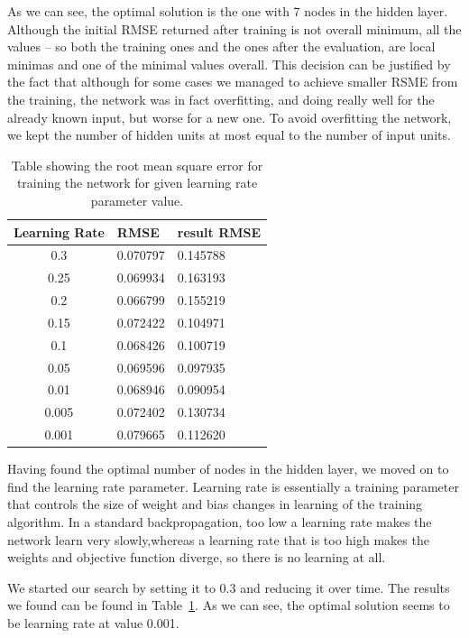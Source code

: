 As we can see, the optimal solution is the one with 7 nodes in the hidden layer. Although the initial RMSE returned after training is not overall minimum, all the values -- so both the training ones and the ones after the evaluation, are local minimas and one of the minimal values overall. This decision can be justified by the fact that although for some cases we managed to achieve smaller RSME from the training, the network was in fact overfitting, and doing really well for the already known input, but worse for a new one.
To avoid overfitting the network, we kept the number of hidden units at most equal to the number of input units. 

\begin{table}
\begin{center}
\begin{tabular} {| c | l | l |} \hline
 Learning Rate & RMSE & result RMSE \\  \hline \hline
 0.3 		& 0.070797 	& 0.145788	\\ \hline
 0.25 	& 0.069934  	& 0.163193	\\ \hline
 0.2 		&  0.066799	& 0.155219	\\ \hline
 0.15		& 0.072422	& 0.104971	\\ \hline
 0.1 		& 0.068426	& 0.100719	\\ \hline
 0.05 	& 0.069596	& 0.097935	\\ \hline
 0.01 	& 0.068946	& 0.090954	\\ \hline
 0.005 	& 0.072402	& 0.130734	\\ \hline
 0.001 	&  0.079665	& 0.112620	\\ \hline
\end{tabular}
\caption{Table showing the root mean square error for training the network for given learning rate parameter value.}
\label{table:learningrate}
\end{center}
\end{table}

Having found the optimal number of nodes in the hidden layer, we moved on to find the learning rate parameter. Learning rate is essentially a training parameter that controls the size of weight and bias changes in learning of the training algorithm. In a standard backpropagation, too low a learning rate makes the network learn very slowly,whereas a learning rate that is too high makes the weights and objective function diverge, so there is no learning at all. 

We started our search by setting it to 0.3 and reducing it over time. The results we found can be found in Table~\ref{table:learningrate}. As we can see, the optimal solution seems to be learning rate at value 0.001.


